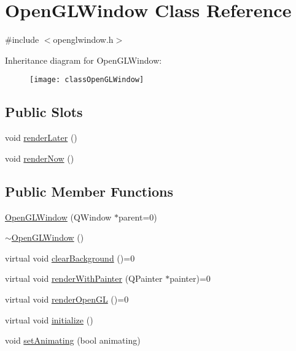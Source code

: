 \hypertarget{classOpenGLWindow}{}\section{Open\+G\+L\+Window Class Reference}
\label{classOpenGLWindow}


{\ttfamily \#include $<$openglwindow.\+h$>$}

Inheritance diagram for Open\+G\+L\+Window\+:\begin{figure}[H]
\begin{center}
\leavevmode
\texttt{[image: classOpenGLWindow]}
\end{center}
\end{figure}
\subsection*{Public Slots}
\begin{DoxyCompactItemize}
\item 
void \hyperlink{classOpenGLWindow_abea9e50147496e5110b86f03122fbece}{render\+Later} ()
\item 
void \hyperlink{classOpenGLWindow_a8398ed62d646739fe54fae94c477ad1d}{render\+Now} ()
\end{DoxyCompactItemize}
\subsection*{Public Member Functions}
\begin{DoxyCompactItemize}
\item 
\hyperlink{classOpenGLWindow_a90bb7dbb2dcb27b1fdc56ef4ef3f25fc}{Open\+G\+L\+Window} (Q\+Window $\ast$parent=0)
\item 
\hyperlink{classOpenGLWindow_aa220b192c71871aab9100f4058a8d62d}{$\sim$\+Open\+G\+L\+Window} ()
\item 
virtual void \hyperlink{classOpenGLWindow_add04ac504dabc486b3847b107e8f1384}{clear\+Background} ()=0
\item 
virtual void \hyperlink{classOpenGLWindow_a0a15a4a8fc68d4318f3a59e884db1497}{render\+With\+Painter} (Q\+Painter $\ast$painter)=0
\item 
virtual void \hyperlink{classOpenGLWindow_aa0cf1ae550a2827b513bfde10f7e97b6}{render\+Open\+GL} ()=0
\item 
virtual void \hyperlink{classOpenGLWindow_aed4e2ee22e113b2f7e7d1eba4ef1b965}{initialize} ()
\item 
void \hyperlink{classOpenGLWindow_a68317e3284d7b0ffba262eac059b6b9e}{set\+Animating} (bool animating)
\end{DoxyCompactItemize}
